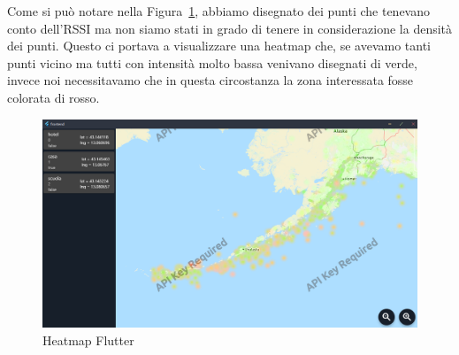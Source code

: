 \documentclass[a4paper]{report}
\begin{document}
Come si può notare nella Figura~\ref{heatmap_flutter}, abbiamo disegnato dei punti che tenevano conto dell'RSSI ma non siamo stati in grado di tenere in considerazione la densità dei punti. Questo ci portava a visualizzare una heatmap che, se avevamo tanti punti vicino ma tutti con intensità molto bassa venivano disegnati di verde, invece noi necessitavamo che in questa circostanza la zona interessata fosse colorata di rosso. 
\begin{figure}[tbp]
    \centering
    \includegraphics[width=\textwidth]{figure/heatmap_flutter.png}
    \caption{Heatmap Flutter}
    \label{heatmap_flutter}
\end{figure}

\printbibliography
\end{document}
